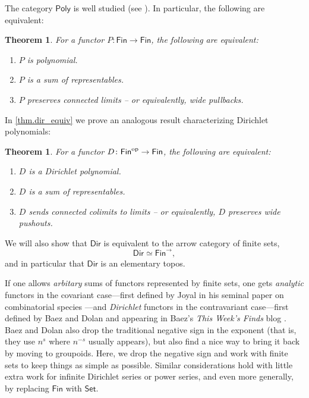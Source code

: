 \documentclass[11pt, article, one side]{memoir}
\theoremstyle{theorem}
\newtheorem{theorem}[section]{Theorem}
\theoremstyle{definition}
\theoremstyle{remark}
\newcommand{\Cat}[1]{\mathsf{#1}}%
\newcommand{\op}{^\tn{op}}
\newcommand{\tn}[1]{\textnormal{#1}}
\newcommand{\smset}{\Cat{Set}}
\newcommand{\fin}{\Cat{Fin}}
\newcommand{\yon}{\mathcal{y}}
\newcommand{\poly}{\Cat{Poly}}
\newcommand{\dir}{\Cat{Dir}}
\begin{document}
The category $\poly$ is well studied (see \cite{kock2012polynomial}). In particular, the following are equivalent:
\begin{theorem}{\cite{kock2012polynomial}}\label{thm.poly_equiv}
For a functor $P\colon \fin \to \fin$, the following are equivalent:
\begin{enumerate}
    \item $P$ is polynomial.
    \item $P$ is a sum of representables.
    \item $P$ preserves connected limits -- or equivalently, wide pullbacks.
\end{enumerate}
\end{theorem}

In \cref{thm.dir_equiv} we prove an analogous result characterizing Dirichlet polynomials:
\begin{theorem}
For a functor $D\colon\fin\op \to \fin$, the following are equivalent:
\begin{enumerate}
    \item $D$ is a Dirichlet polynomial.
    \item $D$ is a sum of representables.
    \item $D$ sends connected colimits to limits -- or equivalently, $D$ preserves wide pushouts.
\end{enumerate}
\end{theorem}

We will also show that $\dir$ is equivalent to the arrow category of finite sets, 
\[\dir \simeq \fin^{\to},\]
and in particular that $\dir$ is an elementary topos.

If one allows \emph{arbitary} sums of functors represented by finite sets, one gets \emph{analytic} functors in the covariant case---first defined by Joyal in his seminal paper on combinatorial species \cite{joyal1981combinatorial}---and \emph{Dirichlet} functors in the contravariant case---first defined by Baez and Dolan and appearing in Baez's \emph{This Week's Finds} blog \cite{baez300}. Baez and Dolan also drop the traditional negative sign in the exponent (that is, they use $n^s$ where $n^{-s}$ usually appears), but also find a nice way to bring it back by moving to groupoids. Here, we drop the negative sign and work with finite sets to keep things as simple as possible. Similar considerations hold with little extra work for infinite Dirichlet series or power series, and even more generally, by replacing $\fin$ with $\smset$. 


\end{document}
